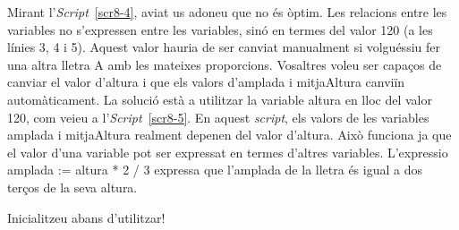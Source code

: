 Mirant l'\emph{Script}~\ref{scr8-4}, aviat us adoneu que no és òptim. Les relacions entre les variables no s'expressen entre les variables, sinó en termes del valor \textsf{120} (a les línies 3, 4 i 5). Aquest valor hauria de ser canviat manualment si volguéssiu fer una altra lletra A amb les mateixes proporcions. Vosaltres voleu ser capaços de canviar el valor d'\textsf{altura} i que els valors d'\textsf{amplada} i \textsf{mitjaAltura} canviïn automàticament. La solució està a utilitzar la variable \textsf{altura} en lloc del valor \textsf{120}, com veieu a l'\emph{Script}~\ref{scr8-5}. En aquest \emph{script}, els valors de les variables \textsf{amplada} i \textsf{mitjaAltura} realment depenen del valor d'\textsf{altura}. Això funciona ja que el valor d'una variable pot ser expressat en termes d'altres variables. L'expressio \textsf{amplada := altura * 2 / 3} expressa que l'amplada de la lletra és igual a dos terços de la seva altura.

\vspace*{2mm}

\noindent
{\large Inicialitzeu abans d'utilitzar!}
\vspace*{5mm}


